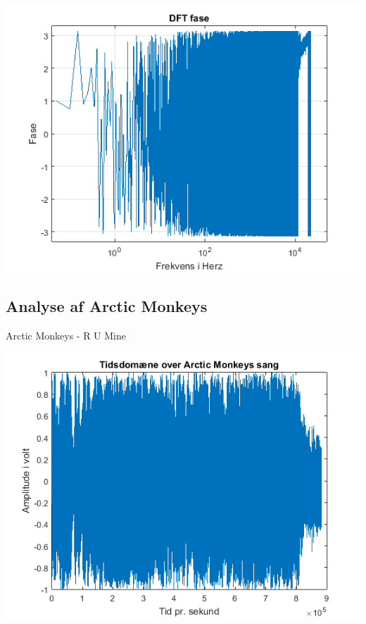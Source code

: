 \documentclass[12pt, letterpaper]{article}
\begin{document}
\begin{center}
\includegraphics[width=\textwidth]{billeder/eminemfase}
\end{center}

\subsection{Analyse af Arctic Monkeys}
Arctic Monkeys - R U Mine

\begin{center}
\includegraphics[width=\textwidth]{billeder/arctictid}
\end{center}
\end{document}
